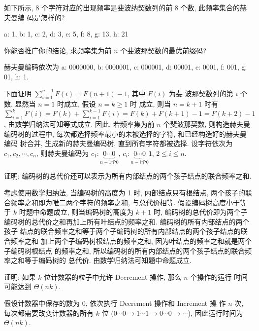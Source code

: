\documentclass[boxes]{homework}
\begin{document}
\begin{problem}
如下所示, 8 个字符对应的出现频率是斐波纳契数列的前 8 个数, 此频率集合的赫夫曼编
码是怎样的?

a: 1, b: 1, c: 2, d: 3, e: 5, f: 8, g: 13, h: 21

你能否推广你的结论, 求频率集为前 $n$ 个斐波那契数的最优前缀码?
\end{problem}
\begin{solution}
    赫夫曼编码依次为 a: 0000000, b: 0000001, c: 000001, d: 00001, e: 0001, f:
    001, g: 01, h: 1.

    下面证明 $\sum\limits_{i = 1}^{n - 1}F(i) = F(n + 1) - 1$, 其中 $F(i)$ 为斐
    波那契数列的第 $i$ 个数. 显然当 $n = 1$ 时成立, 假设 $n = k \geqslant 1$ 时
    成立, 则当 $n = k + 1$ 时有 $\sum\limits_{i = 1}^{k}F(i) = F(k) +
        \sum\limits_{i = 1}^{k - 1}F(i) = F(k) + F(k + 1) - 1 = F(k + 2) - 1$,
    由数学归纳法可知等式成立. 因此, 若频率集为前 $n$ 个斐波那契数, 则构造赫夫曼
    编码树的过程中, 每次都选择频率最小的未被选择的字符, 和已经构造好的赫夫曼编码
    树合并, 生成新的赫夫曼编码树, 直到所有字符都被选择. 设字符依次为
    $c_{1}, c_{2}, \cdots, c_{n}$, 则赫夫曼编码为
    $c_{1}: \underbrace{ 0 \cdots 0 }_{n - 1 \text{个} 0}$,
    $c_{i}: \underbrace{ 0 \cdots 0 }_{n - i \text{个} 0} 1$,
    $2 \leqslant i \leqslant n$.
\end{solution}

\begin{problem}
证明: 编码树的总代价还可以表示为所有内部结点的两个孩子结点的联合频率之和.
\end{problem}
\begin{solution}
    考虑使用数学归纳法, 当编码树的高度为 1 时, 内部结点只有根结点, 两个孩子的联
    合频率之和即为唯二两个字符的频率之和, 与总代价相等. 假设编码树高度小于等于
    $k$ 时题中命题成立, 则当编码树的高度为 $k + 1$ 时, 编码树的总代价即为两个子
    编码树的总代价之和再加上所有叶结点的频率之和. 编码树的所有内部结点的两个孩子
    结点的联合频率之和等于两个子编码树的所有内部结点的两个孩子结点的联合频率之和
    加上两个子编码树根结点的频率之和, 因为叶结点的频率之和就是两个子编码树根结点
    的频率之和, 所以编码树的所有内部结点的两个孩子结点的联合频率之和等于编码树的
    总代价. 由数学归纳法可知题中命题成立.
\end{solution}

\begin{problem}
证明: 如果 $k$ 位计数器的粒子中允许 {\sc Decrement} 操作, 那么 $n$ 个操作的运行
时间可能达到 $\Theta(nk)$.
\end{problem}
\begin{solution}
    假设计数器中保存的数为 0, 依次执行 {\sc Decrement} 操作和 {\sc Increment} 操
    作 $n$ 次, 每次都需要改变计数器的所有 $k$ 位 ($0 \cdots 0 \to 1 \cdots 1
        \to 0 \cdots 0 \to \cdots$), 因此运行时间为 $\Theta(nk)$.
\end{solution}
\end{document}
